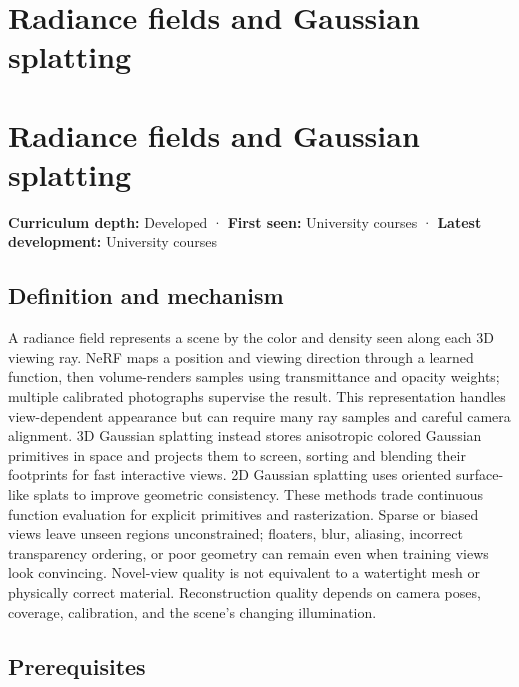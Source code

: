 \hypertarget{appendix-c5b332e400e7}{}
\section*{Radiance fields and Gaussian splatting}
\section{Radiance fields and Gaussian splatting}\label{appendix-c5b332e400e7-radiance-fields-and-gaussian-splatting}

\textbf{Curriculum depth:} Developed · \textbf{First seen:} University courses · \textbf{Latest development:} University courses

\subsection{Definition and mechanism}\label{appendix-c5b332e400e7-definition-and-mechanism}

A radiance field represents a scene by the color and density seen along each 3D viewing ray. NeRF maps a position and viewing direction through a learned function, then volume-renders samples using transmittance and opacity weights; multiple calibrated photographs supervise the result. This representation handles view-dependent appearance but can require many ray samples and careful camera alignment. 3D Gaussian splatting instead stores anisotropic colored Gaussian primitives in space and projects them to screen, sorting and blending their footprints for fast interactive views. 2D Gaussian splatting uses oriented surface-like splats to improve geometric consistency. These methods trade continuous function evaluation for explicit primitives and rasterization. Sparse or biased views leave unseen regions unconstrained; floaters, blur, aliasing, incorrect transparency ordering, or poor geometry can remain even when training views look convincing. Novel-view quality is not equivalent to a watertight mesh or physically correct material. Reconstruction quality depends on camera poses, coverage, calibration, and the scene's changing illumination.

\subsection{Prerequisites}\label{appendix-c5b332e400e7-prerequisites}

